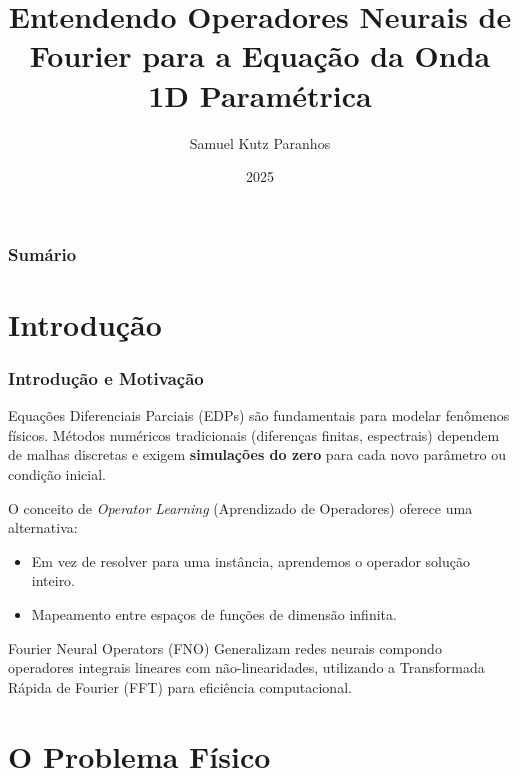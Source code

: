 \documentclass[usenames,dvipsnames,brazil,aspectratio=169]{beamer}
\title{Entendendo Operadores Neurais de Fourier para a Equação da Onda 1D Paramétrica}
\author{Samuel Kutz Paranhos}
\institute{Universidade Federal do Paraná}
\date{2025}
\begin{document}
{
    \begin{frame}[plain]
        \maketitle
    \end{frame}
}

\begin{frame}[t]
    \frametitle{Sumário}
    \tableofcontents
\end{frame}

\section{Introdução}

\begin{frame}[t]
    \frametitle{Introdução e Motivação}
    Equações Diferenciais Parciais (EDPs) são fundamentais para modelar fenômenos físicos. Métodos numéricos tradicionais (diferenças finitas, espectrais) dependem de malhas discretas e exigem \textbf{simulações do zero} para cada novo parâmetro ou condição inicial.
    \vspace{0.5cm}

    O conceito de \textit{Operator Learning} (Aprendizado de Operadores) oferece uma alternativa:
    \begin{itemize}
        \item Em vez de resolver para uma instância, aprendemos o operador solução inteiro.
        \item Mapeamento entre espaços de funções de dimensão infinita.
    \end{itemize}
    \vspace{0.5cm}
    
    \begin{block}{Fourier Neural Operators (FNO) \cite{li2020fourier}}
        Generalizam redes neurais compondo operadores integrais lineares com não-linearidades, utilizando a Transformada Rápida de Fourier (FFT) para eficiência computacional.
    \end{block}
\end{frame}

\section{O Problema Físico}
\end{document}
